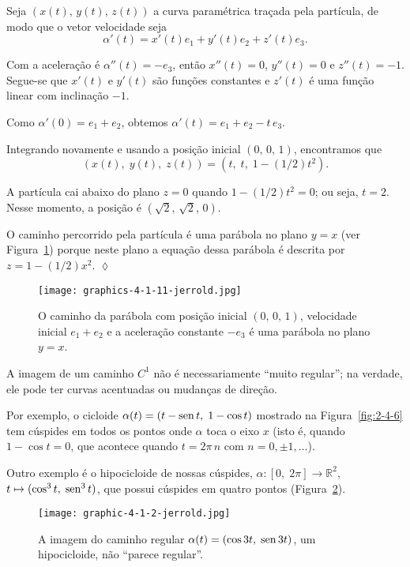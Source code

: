 \solo
Seja $(x(t),\, y(t),\, z(t))$ a curva paramétrica traçada pela partícula, de modo que o vetor velocidade seja
\begin{equation*}
\alpha'(t)=x'(t)e_{1} + y'(t)e_{2}+z'(t)e_{3}.
\end{equation*}

Com a aceleração é  $\alpha''(t)=-e_{3}$, então $x''(t) = 0$, $y''(t) = 0$ e $z''(t)=-1$. Segue-se que $x'(t)$ e $y'(t)$ são funções constantes e
$z'(t)$ é uma função linear com inclinação $-1$.

Como $\alpha'(0)=e_{1}+e_{2}$, obtemos $\alpha'(t)=e_{1}+e_{2}-t\,e_{3}$.

Integrando novamente e usando a posição inicial $(0,\, 0,\, 1)$, encontramos que
\begin{equation*}
(x(t),\; y(t),\; z (t)) = \left(t,\; t,\; 1-(1/2)t^{2}\right).
\end{equation*}

A partícula cai abaixo do plano $z=0$ quando $1-(1/2)t^{2}=0$; ou seja, $t = 2$. Nesse momento, a posição é $\left(\sqrt{2},\, \sqrt{2},\,
0\right)$.

O caminho percorrido pela partícula é uma parábola no plano $y=x$ (ver Figura~\ref{fig:4-1-11-jerrold}) porque neste plano a equação dessa parábola é
descrita por $z=1-(1/2)x^{2}$. \hfill $\lozenge$

\begin{figure}[!h]
  \centering
  \texttt{[image: graphics-4-1-11-jerrold.jpg]}
  \caption{O caminho da parábola com posição inicial \((0,\, 0,\, 1)\), velocidade inicial \(e_{1}+e_{2}\) e a aceleração constante \(-e_{3}\) é uma parábola no plano \(y = x\).}
  \label{fig:4-1-11-jerrold}
\end{figure}


A imagem de um caminho $C^{1}$ não é necessariamente ``muito regular''; na verdade, ele pode ter curvas acentuadas ou mudanças de direção.

Por exemplo, o cicloide $\alpha(t) = (t-\operatorname{sen} t,\; 1-\cos t)$ mostrado na Figura~\ref{fig:2-4-6} tem cúspides em todos os pontos onde $\alpha$ toca o
eixo $x$ (isto é, quando $1-\cos t=0$, que acontece quando $t = 2\pi\,n$ com $n = 0, \pm 1, \ldots$).

Outro exemplo é o hipocicloide de nossas cúspides, $\alpha \colon [0,\; 2\pi] \to \mathbb{R}^{2}$, $t \mapsto (\cos^{3} t,\; \operatorname{sen}^{3} t)$, que possui
cúspides em quatro pontos (Figura~\ref{fig:4-1-2-jerrold}).
\begin{figure}[h!]
  \centering
  \texttt{[image: graphic-4-1-2-jerrold.jpg]}
  \caption{A imagem do caminho regular \(\alpha(t) = (\cos 3 t,\; \operatorname{sen} 3 t)\), um hipocicloide, não ``parece regular''.}
  \label{fig:4-1-2-jerrold}
\end{figure}

